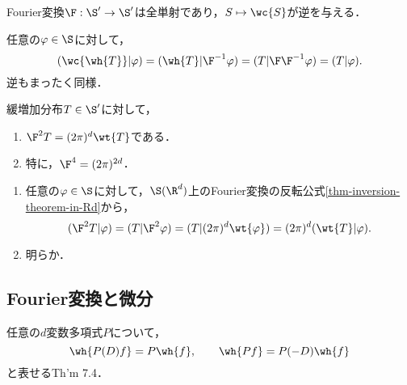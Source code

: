 \documentclass[uplatex,dvipdfmx]{jsreport}
\begin{document}
\begin{proposition}[全単射性]
    Fourier変換$\F:\S'\to\S'$は全単射であり，$S\mapsto\wc{S}$が逆を与える．
\end{proposition}
\begin{Proof}
    任意の$\varphi\in\S$に対して，
    \[(\wc{\wh{T}}|\varphi)=(\wh{T}|\F^{-1}\varphi)=(T|\F\F^{-1}\varphi)=(T|\varphi).\]
    逆もまったく同様．
\end{Proof}

\begin{proposition}
    緩増加分布$T\in\S'$に対して，
    \begin{enumerate}
        \item $\F^2T=(2\pi)^d\wt{T}$である．
        \item 特に，$\F^4=(2\pi)^{2d}$．
    \end{enumerate}
\end{proposition}
\begin{Proof}\mbox{}
    \begin{enumerate}
        \item 任意の$\varphi\in\S$に対して，$\S(\R^d)$上のFourier変換の反転公式\ref{thm-inversion-theorem-in-Rd}から，
        \[(\F^2T|\varphi)=(T|\F^2\varphi)=(T|(2\pi)^d\wt{\varphi})=(2\pi)^d(\wt{T}|\varphi).\]
        \item 明らか．
    \end{enumerate}
\end{Proof}

\subsection{Fourier変換と微分}

\begin{tcolorbox}[colframe=ForestGreen, colback=ForestGreen!10!white,breakable,colbacktitle=ForestGreen!40!white,coltitle=black,fonttitle=\bfseries\sffamily,
title=]
    任意の$d$変数多項式$P$について，
    \[\wh{P(D)f}=P\wh{f},\qquad\wh{Pf}=P(-D)\wh{f}\]
    と表せる\cite{Rudin-FunctionalAnalysis}Th'm 7.4．
\end{tcolorbox}
\end{document}
